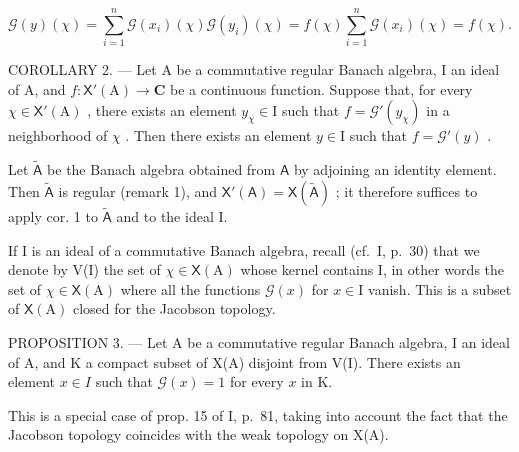 \[
\mathcal {G} (y) (\chi) = \sum_ {i = 1} ^ {n} \mathcal {G} (x _ {i}) (\chi) \mathcal {G} (y _ {i}) (\chi) = f (\chi) \sum_ {i = 1} ^ {n} \mathcal {G} (x _ {i}) (\chi) = f (\chi).
\]

COROLLARY 2. --- Let A be a commutative regular Banach algebra, I an ideal of A, and \(f\colon\mathsf{X}'(\mathrm{A})\to\mathbf{C}\) be a continuous function. Suppose that, for every \(\chi\in\mathsf{X}'(\mathrm{A})\) , there exists an element \(y_{\chi}\in\mathrm{I}\) such that \(f=\mathcal{G}'(y_{\chi})\) in a neighborhood of \(\chi\) . Then there exists an element \(y\in\mathrm{I}\) such that \(f=\mathcal{G}'(y)\) .

Let \(\tilde{\mathsf{A}}\) be the Banach algebra obtained from \(\mathsf{A}\) by adjoining an identity element. Then \(\tilde{\mathsf{A}}\) is regular (remark 1), and \(\mathsf{X}'(\mathsf{A}) = \mathsf{X}(\widetilde{\mathsf{A}})\) ; it therefore suffices to apply cor. 1 to \(\tilde{\mathsf{A}}\) and to the ideal I.

If I is an ideal of a commutative Banach algebra, recall (cf.~I, p.~30) that we denote by V(I) the set of \(\chi \in \mathsf{X}(\mathrm{A})\) whose kernel contains I, in other words the set of \(\chi \in \mathsf{X}(\mathrm{A})\) where all the functions \(\mathcal{G}(x)\) for \(x \in \mathrm{I}\) vanish. This is a subset of \(\mathsf{X}(\mathrm{A})\) closed for the Jacobson topology.

PROPOSITION 3. --- Let A be a commutative regular Banach algebra, I an ideal of A, and K a compact subset of X(A) disjoint from V(I). There exists an element \(x \in I\) such that \(\mathcal{G}(x) = 1\) for every \(x\) in K.

This is a special case of prop. 15 of I, p.~81, taking into account the fact that the Jacobson topology coincides with the weak topology on X(A).
